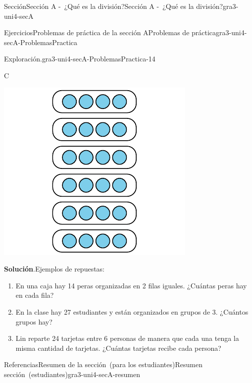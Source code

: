 \documentclass[oneside,10pt,]{article}
\newcommand{\blocktitlefont}{\relax}
\begin{document}
\begin{sectionptx}{Sección}{Sección A -~¿Qué es la división?}{}{Sección A -~¿Qué es la división?}{}{}{gra3-uni4-secA}
\begin{exercises-subsection}{Ejercicios}{Problemas de práctica de la sección A}{}{Problemas de práctica}{}{}{gra3-uni4-secA-ProblemasPractica}
\begin{divisionexercise}{12}{Exploración.}{}{gra3-uni4-secA-ProblemasPractica-14}
\begin{sidebyside}{3}{0}{0}{0.02}
\begin{sbspanel}{0.32}
\end{sbspanel}%
\begin{sbspanel}{0.32}%
C%
\par
\includegraphics[width=\linewidth]{external/svg-source/tikz-file-151676.pdf}
\end{sbspanel}%
\end{sidebyside}%
\par\smallskip%
\noindent\textbf{\blocktitlefont Solución}.\hypertarget{gra3-uni4-secA-ProblemasPractica-14-3}{}\quad{}Ejemplos de repuestas:%
%
\begin{enumerate}[label={\Alph*.}]
\item{}En una caja hay 14 peras organizadas en 2 filas iguales. ¿Cuántas peras hay en cada fila?%
\item{}En la clase hay 27 estudiantes y están organizados en grupos de 3. ¿Cuántos grupos hay?%
\item{}Lin reparte 24 tarjetas entre 6 personas de manera que cada una tenga la misma cantidad de tarjetas. ¿Cuántas tarjetas recibe cada persona?%
\end{enumerate}
\end{divisionexercise}%
\end{exercises-subsection}
%
%
\typeout{************************************************}
\typeout{************************************************}
%
\begin{references-subsection}{Referencias}{Resumen de la sección~(para los estudiantes)}{}{Resumen sección~(estudiantes)}{}{}{gra3-uni4-secA-resumen}

\end{references-subsection}
\end{sectionptx}
\end{document}
